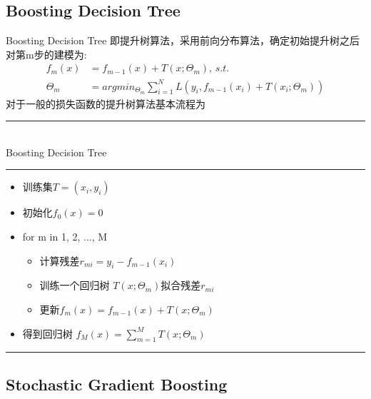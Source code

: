 \documentclass[a4paper]{article}
\begin{document}
	\subsection{Boosting Decision Tree}
		Boosting Decision Tree 即提升树算法，采用前向分布算法，确定初始提升树之后对第m步的建模为:
			\begin{align*}
				f_m(x) & = f_{m-1}(x) + T(x;\Theta_m), \,s.t. \\
					\hat{\Theta}_m &= argmin_{\Theta_m}\sum_{i=1}^{N}L(y_i, f_{m-1}(x_i)+T(x_i;\Theta_m))
			\end{align*}
			对于一般的损失函数的提升树算法基本流程为\par
		\noindent\rule[0.10\baselineskip]{\textwidth}{0.75pt}\\
		Boosting Decision Tree\\
		\noindent\rule[0.10\baselineskip]{\textwidth}{0.5pt}
			\begin{itemize}
				\item 训练集$T={(x_i,y_i)}$
				\item 初始化$f_0(x) = 0$
				\item for m in 1, 2, ..., M
					\begin{itemize}
						\item 计算残差$r_{mi} = y_i - f_{m-1}(x_i)$
						\item 训练一个回归树 $T(x;\Theta_m)$拟合残差$r_{mi}$
						\item 更新$f_m(x)  = f_{m-1}(x) + T(x;\Theta_m)$
					\end{itemize}
				\item 得到回归树 $f_M(x) = \sum_{m=1}^{M}T(x;\Theta_m)$
			\end{itemize}
		\noindent\rule[0.10\baselineskip]{\textwidth}{0.75pt}\par

	\subsection{Stochastic Gradient Boosting}
\end{document}
